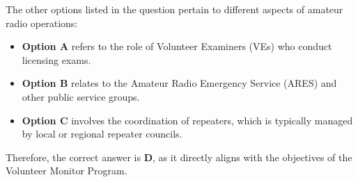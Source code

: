 The other options listed in the question pertain to different aspects of amateur radio operations:
\begin{itemize}
    \item \textbf{Option A} refers to the role of Volunteer Examiners (VEs) who conduct licensing exams.
    \item \textbf{Option B} relates to the Amateur Radio Emergency Service (ARES) and other public service groups.
    \item \textbf{Option C} involves the coordination of repeaters, which is typically managed by local or regional repeater councils.
\end{itemize}

Therefore, the correct answer is \textbf{D}, as it directly aligns with the objectives of the Volunteer Monitor Program.

